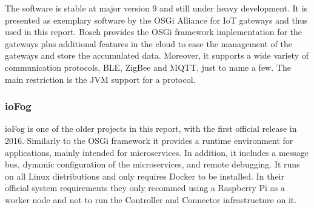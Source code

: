The software is stable at major version 9 and still under heavy development. It is presented as exemplary software by the OSGi Alliance for IoT gateways \cite{exampleIoTGateweOSGi:online} and thus used in this report. Bosch provides the OSGi framework implementation for the gateways plus additional features in the cloud to ease the management of the gateways and store the accumulated data. Moreover, it supports a wide variety of communication protocols, BLE, ZigBee and MQTT, just to name a few. The main restriction is the JVM support for a protocol.  

\subsubsection{ioFog}
ioFog is one of the older projects in this report, with the first official release in 2016\cite{ioFogMainBlog:online}. Similarly to the OSGi framework it provides a runtime environment for applications, mainly intended for microservices. In addition, it includes a message bus, dynamic configuration of the microservices, and remote debugging\cite{ioFogMainBlog:online}. It runs on all Linux distributions and only requires Docker to be installed. In their official system requirements they only recommed using a Raspberry Pi as a worker node and not to run the Controller and Connector infrastructure on it\cite{ioFOgQuickStart:online}.

